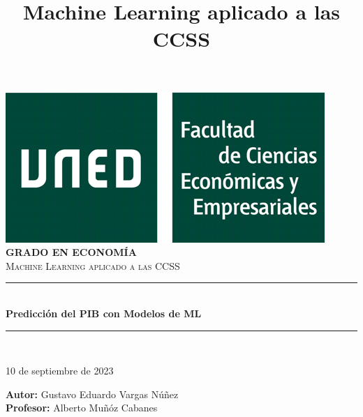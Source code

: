 \documentclass[12pt]{article}
\begin{document}

\begin{titlepage}
\title{Machine Learning aplicado a las CCSS}
\newcommand{\HRule}{\rule{\linewidth}{0.5mm}} %

\center %

\includegraphics[scale=0.25]{uned_emp}\\[.5cm]

\textsc{\large \bfseries GRADO EN ECONOMÍA}\\[.5cm] %

\vspace{25mm}
\textsc{\Large Machine Learning aplicado a las CCSS}\\[1.2cm]
\HRule \\[0.4cm]
{ \LARGE \bfseries Predicción del PIB con Modelos de ML}\\[0.5cm] %
\HRule \\[.5cm]
\vspace{10mm}

\vspace{10mm}

{\large 10 de septiembre de 2023}\\[4cm] 

\raggedright

{\large \textbf{Autor:} Gustavo Eduardo Vargas Núñez}\\[.3cm]
{\large \textbf{Profesor:} Alberto Muñóz Cabanes}\\[.3cm]
\vspace{5mm}

\end{titlepage}

\end{document}
